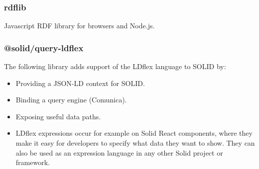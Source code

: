 \subsubsection{rdflib}

Javascript RDF library for browsers and Node.js. 

\subsubsection{@solid/query-ldflex}

The following library adds support of the LDflex language to SOLID by:

\begin{itemize}
	\item Providing a JSON-LD context for SOLID.
    \item Binding a query engine (Comunica).
    \item Exposing useful data paths.
    \item LDflex expressions occur for example on Solid React components, where they make it easy for developers to specify what data they want to show. They can also be used as an expression language in any other Solid project or framework.
\end{itemize}
